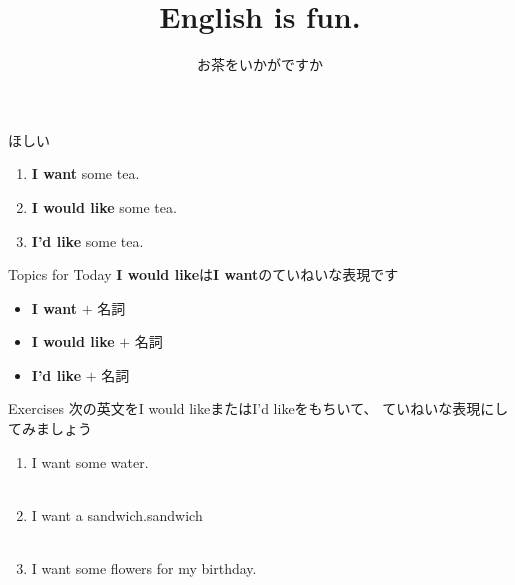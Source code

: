 \documentclass[aspectratio=169,xcolor={dvipsnames,table}]{beamer}
\title{English is fun.}
\subtitle{お茶をいかがですか}
\author{}
\institute[]{}
\date[]
\begin{document}
\begin{frame}[plain]
  \titlepage
\end{frame}


\begin{frame}[plain]{ほしい}
\large
 \begin{enumerate}
  \item \textbf{I want} some tea.
  \item \textbf{I would like} some tea.
  \item {\bfseries I'd like} some tea.
 \end{enumerate}

\begin{block}{Topics for Today}\small
\textbf{I would like}は\textbf{I want}のていねいな表現です
\begin{itemize}[square]\small
 \item \textbf{I want} $+$ 名詞
 \item \textbf{I would like} $+$ 名詞
 \item \textbf{I'd like} $+$ 名詞
       \end{itemize}
\end{block}

\hfill{\scriptsize {}}
\end{frame}
\begin{frame}[plain]{Exercises}
次の英文をI would likeまたはI'd likeをもちいて、 ていねいな表現にしてみましょう
 \begin{enumerate}
  \item I want some water.\\
\\
  \item I want a sandwich.\hfill{\scriptsize sandwich }\\
\\
  \item I want some flowers for my birthday.\\
\\
 \end{enumerate}

\hfill{\scriptsize {}}

\end{frame}
\end{document}

